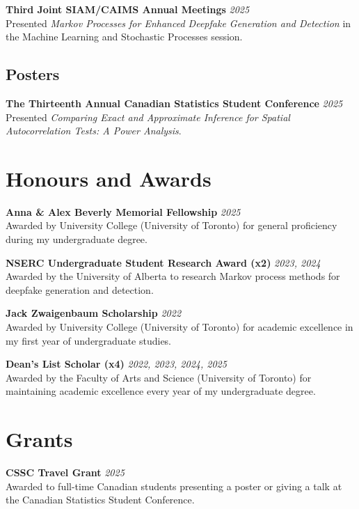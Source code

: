 \documentclass[11pt]{article}
\theoremstyle{definition}
\newcommand{\1}{\mathds 1}
\begin{document}
\textbf{Third Joint SIAM/CAIMS Annual Meetings} \hfill \textit{2025}\\
Presented \textit{Markov Processes for Enhanced Deepfake Generation and Detection} in the Machine Learning and Stochastic Processes session.

\subsection*{Posters}
\textbf{The Thirteenth Annual Canadian Statistics Student Conference} \hfill \textit{2025}\\
Presented \textit{Comparing Exact and Approximate Inference for Spatial Autocorrelation Tests: A Power Analysis}.

\section*{Honours and Awards}
\textbf{Anna \& Alex Beverly Memorial Fellowship} \hfill \textit{2025}\\
Awarded by University College (University of Toronto) for general proficiency during my undergraduate degree.
\vspace{0.5em}

\textbf{NSERC Undergraduate Student Research Award (x2)} \hfill \textit{2023, 2024}\\
Awarded by the University of Alberta to research Markov process methods for deepfake generation and detection. 
\vspace{0.5em}

\textbf{Jack Zwaigenbaum Scholarship }\hfill \textit{2022}\\
Awarded by University College (University of Toronto) for academic excellence in my first year of undergraduate studies.
\vspace{0.5em}

\textbf{Dean's List Scholar (x4)} \hfill \textit{2022, 2023, 2024, 2025}\\
Awarded by the Faculty of Arts and Science (University of Toronto) for maintaining academic excellence every year of my undergraduate degree. 

\section*{Grants}
\textbf{CSSC Travel Grant} \hfill \textit{2025}\\
Awarded to full-time Canadian students presenting a poster or giving a talk at the Canadian Statistics Student Conference.
\end{document}
